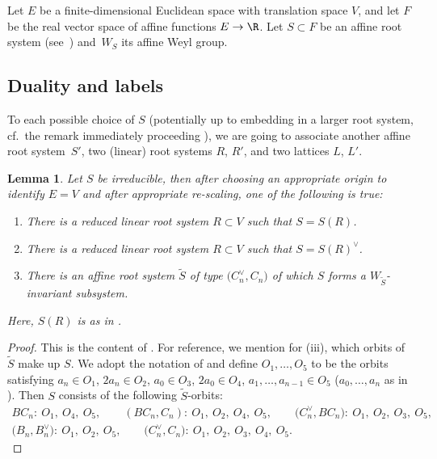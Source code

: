 \documentclass[10pt,a4paper]{amsart}
\newtheorem{Lemma}[Theorem]{Lemma}
\theoremstyle{definition}
\numberwithin{equation}{section}
\begin{document}
Let $E$ be a finite-dimensional Euclidean space with translation space $V$, and let $F$ be the
real vector space of affine functions $E\to\R$. Let $S\subset F$ be an affine root system (see~\cite{macdoARS}) and~$W_S$ its affine Weyl group.

\subsection{Duality and labels}
To each possible choice of $S$ (potentially up to embedding in a larger
root system, cf.\ the remark immediately proceeding \cite[Section~1.4]{macdonald}), we are going to associate another affine root system~$S'$, two
(linear) root systems $R$, $R'$, and two lattices $L$, $L'$.

\begin{Lemma}\label{sec:lem-all-affine-root-systems}
 Let $S$ be irreducible, then after choosing an appropriate origin to identify $E=V$ and after appropriate re-scaling,
 one of the following is true:
 \begin{enumerate}\itemsep=0pt
 \item[$(i)$] There is a reduced linear root system $R\subset V$ such that $S=S(R)$.
 \item[$(ii)$] There is a reduced linear root system $R\subset V$ such that $S=S(R)^\vee$.
 \item[$(iii)$] There is an affine root system $\tilde{S}$ of type $\bigl(C_n^\vee, C_n\bigr)$ of which $S$ forms
 a $W_{\tilde{S}}$-invariant subsystem.
 \end{enumerate}
 Here, $S(R)$ is as in {\rm \cite[Section~1.2.1]{macdonald}}.
\end{Lemma}
\begin{proof}
 This is the content of \cite[Section~1.3]{macdonald}.
 For reference, we mention for (iii), which orbits of $\tilde{S}$ make up
 $S$.
 We adopt the notation of \cite[Section~1.3]{macdonald}
 and define $O_1,\dots,O_5$ to be the orbits satisfying
$
 a_n\in O_1$, $ 2a_n\in O_2$, $ a_0\in O_3$, $ 2a_0\in O_4$, $ a_1,\dots,a_{n-1}\in O_5$
 ($a_0,\dots,a_n$ as in \cite[Section~1.3.18]{macdonald}).
 Then $S$ consists of the following
 $\tilde{S}$-orbits:
 \begin{gather*}
 BC_n\colon\ O_1,\ O_4,\ O_5,\qquad
 (BC_n, C_n)\colon\ O_1,\ O_2,\ O_4,\ O_5,\qquad
 \bigl(C_n^\vee, BC_n\bigr)\colon\ O_1,\ O_2,\ O_3,\ O_5,\\
 \bigl(B_n, B_n^\vee\bigr)\colon\ O_1,\ O_2,\ O_5,\qquad
 \bigl(C_n^\vee, C_n\bigr)\colon\ O_1,\ O_2,\ O_3,\ O_4,\ O_5.\tag*{\qed}
 \end{gather*} \renewcommand{\qed}{}
\end{proof}
\end{document}
